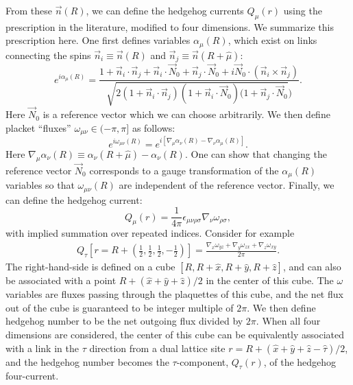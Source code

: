 \documentclass[prb,twocolumn]{revtex4-1}
\begin{document}
From these $\vec{n}(R)$, we can define the hedgehog currents $Q_\mu(r)$ using the prescription in the literature\cite{KamalMurthy,LauDasgupta,SachdevHedgehogs,LesikAshvin}, modified to four dimensions. We summarize this prescription here. One first defines variables $\alpha_\mu(R)$, which exist on links connecting the spins $\vec{n}_i\equiv\vec n(R)$ and $\vec{n}_j\equiv\vec n(R+\hat\mu)$:
\begin{equation}
e^{i\alpha_{\mu}(R)}=\frac{1+\vec{n}_i\cdot\vec{n}_j+\vec{n}_i\cdot\vec{N}_0+\vec{n}_j\cdot\vec{N}_0+i\vec{N}_0 \cdot(\vec{n}_i\times\vec{n}_j)}{\sqrt{2(1+\vec{n}_i\cdot\vec{n}_j)(1+\vec{n}_i\cdot\vec{N}_0)(1+\vec{n}_j\cdot\vec{N}_0})}.
\label{alpha}
\end{equation}
Here $\vec{N}_0$ is a reference vector which we can choose arbitrarily. 
We then define placket ``fluxes'' $\omega_{\mu\nu}\in (-\pi,\pi]$ as follows:
\begin{equation}
e^{i \omega_{\mu\nu}(R)} = 
e^{i [\nabla_\mu\alpha_\nu(R)-\nabla_\nu\alpha_\mu(R)]}.
\label{omega}
\end{equation}
Here $\nabla_\mu \alpha_\nu(R)\equiv \alpha_\nu(R+\hat{\mu})-\alpha_\nu(R)$. One can show that changing the reference vector $\vec{N}_0$ corresponds to a gauge transformation of the $\alpha_\mu(R)$ variables so that $\omega_{\mu\nu}(R)$ are independent of the reference vector. Finally, we can define the hedgehog current:
\begin{equation}
Q_\mu(r)=\frac{1}{4\pi}\epsilon_{\mu\nu\rho\sigma}\nabla_{\nu} \omega_{\rho\sigma},
\label{monopoledef}
\end{equation}
with implied summation over repeated indices.
Consider for example 
\begin{eqnarray}
Q_\tau[r=R+(\frac{1}{2},\frac{1}{2},\frac{1}{2},-\frac{1}{2})]=\frac{\nabla_x\omega_{yz}+\nabla_y\omega_{zx}+\nabla_z\omega_{xy}}{2\pi}. \nonumber
\end{eqnarray}
The right-hand-side is defined on a cube $[R, R+\hat{x}, R+\hat{y}, R+\hat{z}]$, and can also be associated with a point $R + (\hat{x} + \hat{y} + \hat{z})/2$ in the center of this cube.
The $\omega$ variables are fluxes passing through the plaquettes of this cube, and the net flux out of the cube is guaranteed to be integer multiple of $2\pi$.  We then define hedgehog number to be the net outgoing flux divided by $2\pi$.
When all four dimensions are considered, the center of this cube can be equivalently associated with a link in the $\tau$ direction from a dual lattice site $r = R + (\hat{x} + \hat{y} + \hat{z} - \hat{\tau})/2$, and the hedgehog number becomes the $\tau$-component, $Q_\tau(r)$, of the hedgehog four-current.
\end{document}
